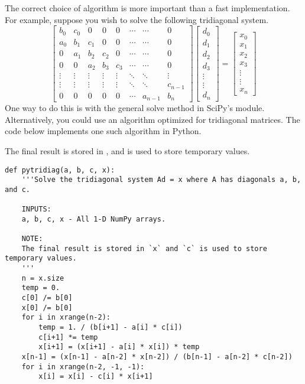 The correct choice of algorithm is more important than a fast implementation.
For example, suppose you wish to solve the following tridiagonal system.
\[\begin{bmatrix}
b_0 & c_0 & 0 & 0 & 0 & \cdots & \cdots & 0 \\
a_0 & b_1 & c_1 & 0 & 0 & \cdots & \cdots & 0 \\
0 & a_1 & b_2 & c_2 & 0 & \cdots & \cdots & 0 \\
0 & 0 & a_2 & b_3 & c_3 & \cdots & \cdots & 0 \\
\vdots & \vdots & \vdots & \vdots & \vdots & \ddots & \ddots & \vdots \\
\vdots & \vdots & \vdots & \vdots & \vdots & \ddots & \ddots & c_{n-1} \\
0 & 0 & 0 & 0 & 0 & \cdots & a_{n-1} & b_n
\end{bmatrix}
\begin{bmatrix}
d_0\\
d_1\\
d_2\\
d_3\\
\vdots\\
\vdots\\
d_n
\end{bmatrix}
=
\begin{bmatrix}
x_0\\
x_1\\
x_2\\
x_3\\
\vdots\\
\vdots\\
x_n
\end{bmatrix}\]
One way to do this is with the general solve method in SciPy's  module.
Alternatively, you could use an algorithm optimized for tridiagonal matrices.
The code below implements one such algorithm in Python.

The final result is stored in , and  is used to store temporary values.
\begin{lstlisting}
def pytridiag(a, b, c, x):
    '''Solve the tridiagonal system Ad = x where A has diagonals a, b, and c.
    
    INPUTS:
    a, b, c, x - All 1-D NumPy arrays.
    
    NOTE:
    The final result is stored in `x` and `c` is used to store temporary values.
    '''
    n = x.size
    temp = 0.
    c[0] /= b[0]
    x[0] /= b[0]
    for i in xrange(n-2):
        temp = 1. / (b[i+1] - a[i] * c[i])
        c[i+1] *= temp
        x[i+1] = (x[i+1] - a[i] * x[i]) * temp
    x[n-1] = (x[n-1] - a[n-2] * x[n-2]) / (b[n-1] - a[n-2] * c[n-2])
    for i in xrange(n-2, -1, -1):
        x[i] = x[i] - c[i] * x[i+1]
\end{lstlisting}

